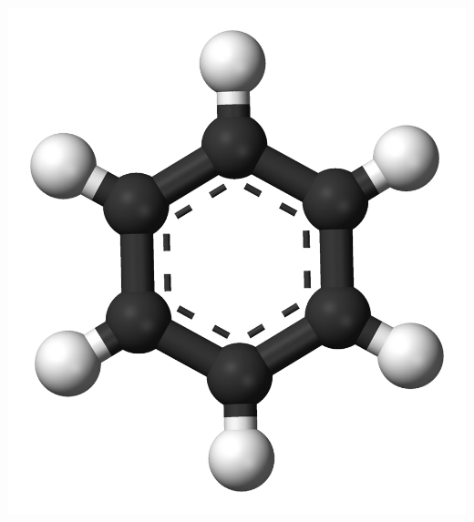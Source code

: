 \begin{frame}
\begin{columns}
\begin{column}[b]{0.30\linewidth}
        \includegraphics[scale=0.1, clip, viewport = 0 0 1000 1200]{figures/benzene.png}

        \vspace{5mm}

    \end{column}
    \end{columns}
\end{frame}


